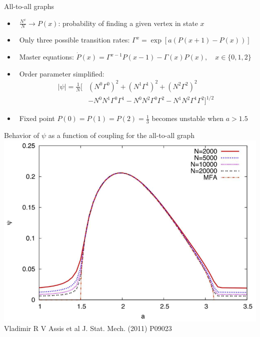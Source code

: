 \documentclass[serif,mathserif]{beamer}
\begin{document}
\begin{frame}
    All-to-all graphs
    \begin{itemize}
        \vspace{0.35cm}
        \item \ \pause $\frac{N^x}{N} \rightarrow P(x)$: probability of finding a given vertex in state $x$
        \vspace{0.35cm}
        \item \ \pause Only three possible transition rates: $\Gamma^x = \exp \left[ a (P(x+1) - P(x)) \right]$
        \vspace{0.35cm}
        \item \ \pause Master equations: $\dot P(x) = \Gamma^{x-1}P(x-1) - \Gamma(x)P(x), \quad x \in \{0, 1, 2\}$
        \vspace{0.35cm}
        \item \ \pause Order parameter simplified:\\
        \begin{equation*}
            \begin{split}
                |\psi| = \frac{1}{N} [
                & \left(N^0\Gamma^0\right)^2
                + \left(N^1\Gamma^1\right)^2
                + \left(N^2\Gamma^2\right)^2\\
                & - N^0N^1\Gamma^0\Gamma^1
                - N^0N^2\Gamma^0\Gamma^2
                - N^1N^2\Gamma^1\Gamma^2
            ]^{1/2}
            \end{split}
        \end{equation*}
        \vspace{0.35cm}
        \item \ \pause Fixed point $P(0) = P(1) = P(2) = \frac{1}{3}$ becomes unstable when $a>1.5$
    \end{itemize}
\end{frame}

\begin{frame}
    \centering
    Behavior of $\psi$ as a function of coupling for the all-to-all graph\\
    \vspace{0.8cm}
    \includegraphics[height=0.7\textheight]{./psi-vs-a.eps}\\
    Vladimir R V Assis et al J. Stat. Mech. (2011) P09023
\end{frame}
\end{document}
